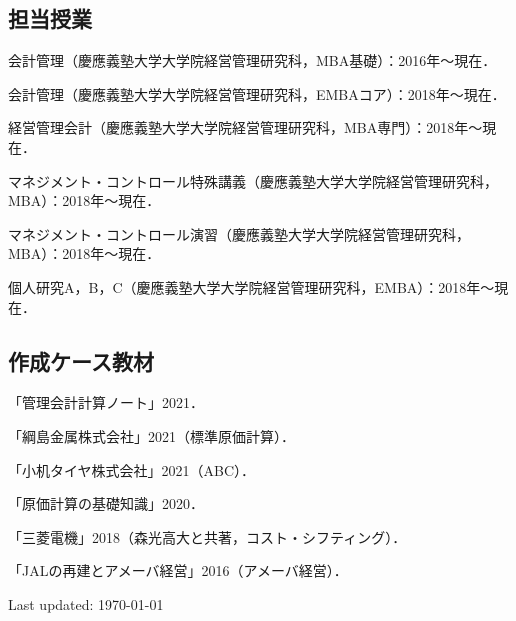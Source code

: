 \documentclass[letterpaper,uplatex]{article}
\def\footerlink{http://jblevins.org/projects/cv-template/}
\renewenvironment{itemize}{
  \begin{list}{}{
    \setlength{\leftmargin}{1.5em}
  }
}{
  \end{list}
}
\begin{document}
\subsection*{担当授業}

\begin{itemize}
    \item 会計管理（慶應義塾大学大学院経営管理研究科，MBA基礎）：2016年〜現在．
    \item 会計管理（慶應義塾大学大学院経営管理研究科，EMBAコア）：2018年〜現在．
    \item 経営管理会計（慶應義塾大学大学院経営管理研究科，MBA専門）：2018年〜現在．
    \item マネジメント・コントロール特殊講義（慶應義塾大学大学院経営管理研究科，MBA）：2018年〜現在．
    \item マネジメント・コントロール演習（慶應義塾大学大学院経営管理研究科，MBA）：2018年〜現在．
    \item 個人研究A，B，C（慶應義塾大学大学院経営管理研究科，EMBA）：2018年〜現在．
\end{itemize}

\subsection*{作成ケース教材}

\begin{itemize}
    \item 「管理会計計算ノート」2021．
    \item 「綱島金属株式会社」2021（標準原価計算）．
    \item 「小机タイヤ株式会社」2021（ABC）．
   \item 「原価計算の基礎知識」2020． 
   \item 「三菱電機」2018（森光高大と共著，コスト・シフティング）．
   \item 「JALの再建とアメーバ経営」2016（アメーバ経営）．
\end{itemize}

\bigskip

\begin{center}
  \begin{footnotesize}
    Last updated: \today \\
  \end{footnotesize}
\end{center}
\end{document}
